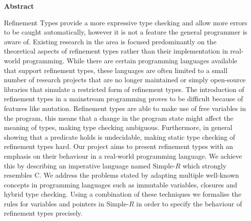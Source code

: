 \newpage
{\Huge \bf Abstract}
\vspace{24pt} 

Refinement Types provide a more expressive type checking and allow more errors to be caught automatically, however it is not a feature the general programmer is aware of. Existing research in the area is focused predominantly on the theoretical aspects of refinement types rather than their implementation in real-world programming. While there are certain programming languages available that support refinement types, these languages are often limited to a small number of research projects that are no longer maintained or simply open-source libraries that simulate a restricted form of refinement types. The introduction of refinement types in a mainstream programming proves to be difficult because of features like mutation. Refinement types are able to make use of free variables in the program, this means that a change in the program state might affect the meaning of types, making type checking ambiguous. Furthermore, in general showing that a predicate holds is undecidable, making static type checking of refinement types hard. Our project aims to present refinement types with an emphasis on their behaviour in a real-world programming language. We achieve this by describing an imperative language named Simple-$R$ which strongly resembles C. We address the problems stated by adapting multiple well-known concepts in programming languages such as immutable variables, closures and hybrid type checking. Using a combination of these techniques we formalise the rules for variables and pointers in Simple-$R$ in order to specify the behaviour of refinement types precisely. 

\newpage
\vspace*{\fill}
